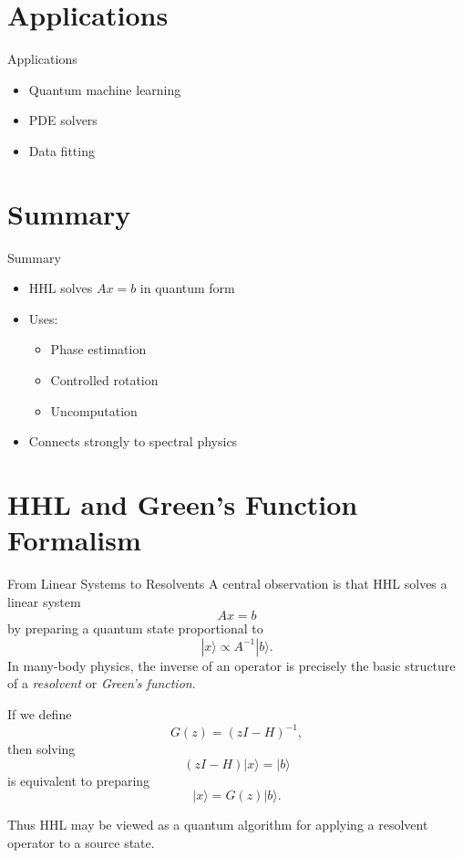 \documentclass{beamer}
\begin{document}
\section{Applications}

\begin{frame}{Applications}
\begin{itemize}
\item Quantum machine learning
\item PDE solvers
\item Data fitting
\end{itemize}
\end{frame}

\section{Summary}

\begin{frame}{Summary}
\begin{itemize}
\item HHL solves $A x = b$ in quantum form
\item Uses:
\begin{itemize}
\item Phase estimation
\item Controlled rotation
\item Uncomputation
\end{itemize}
\item Connects strongly to spectral physics
\end{itemize}
\end{frame}

\section{HHL and Green's Function Formalism}

\begin{frame}{From Linear Systems to Resolvents}
A central observation is that HHL solves a linear system
\[
A x = b
\]
by preparing a quantum state proportional to
\[
|x\rangle \propto A^{-1}|b\rangle.
\]
In many-body physics, the inverse of an operator is precisely the basic structure of a
\emph{resolvent} or \emph{Green's function}.

If we define
\[
G(z) = (z I - H)^{-1},
\]
then solving
\[
(zI-H)|x\rangle = |b\rangle
\]
is equivalent to preparing
\[
|x\rangle = G(z)|b\rangle.
\]

Thus HHL may be viewed as a quantum algorithm for applying a resolvent operator to a source state.
\end{frame}
\end{document}
